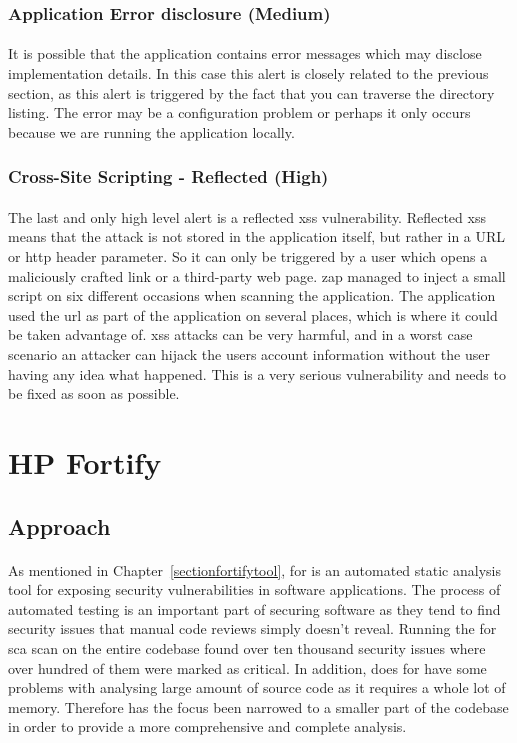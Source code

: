 \documentclass[11pt,english,a4paper]{report}
\begin{document}
\subsubsection{Application Error disclosure (Medium)}
\paragraph{}
It is possible that the application contains error messages which may disclose implementation details. 
In this case this alert is closely related to the previous section, as this alert is triggered by the fact that you can traverse the directory listing. 
The error may be a configuration problem or perhaps it only occurs because we are running the application locally.

\subsubsection{Cross-Site Scripting - Reflected (High)}
\paragraph{}
The last and only high level alert is a reflected \gls{xss} vulnerability. 
Reflected \gls{xss} means that the attack is not stored in the application itself, but rather in a URL or \gls{http} header parameter.
So it can only be triggered by a user which opens a maliciously crafted link or a third-party web page.
\gls{zap} managed to inject a small script on six different occasions when scanning the application.
The application used the \gls{url} as part of the application on several places, which is where it could be taken advantage of.
\gls{xss} attacks can be very harmful, and in a worst case scenario an attacker can hijack the users account information without the user having any idea what happened.
This is a very serious vulnerability and needs to be fixed as soon as possible.


\section{HP Fortify}
\subsection{Approach}
\paragraph{}
As mentioned in Chapter~\ref{sectionfortifytool}, \gls{for} is an automated static analysis tool for exposing security vulnerabilities in software applications. 
The process of automated testing is an important part of securing software as they tend to find security issues that manual code reviews simply doesn't reveal.
Running the \gls{for} \gls{sca} scan on the entire codebase found over ten thousand security issues where over hundred of them were marked as critical.
In addition, does \gls{for} have some problems with analysing large amount of source code as it requires a whole lot of memory.
Therefore has the focus been narrowed to a smaller part of the codebase in order to provide a more comprehensive and complete analysis.
\end{document}
